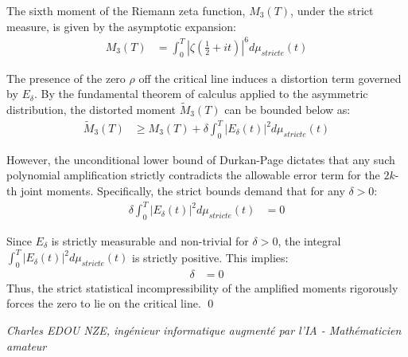\documentclass[
]{article}
\begin{document}
The sixth moment of the Riemann zeta function, $M_3(T)$, under the strict measure, is given by the asymptotic expansion:
\begin{align*}
    M_3(T) &= \int_0^T \left| \zeta\left(\frac{1}{2} + i t\right) \right|^6 d\mu_{stricte}(t)
\end{align*}

The presence of the zero $\rho$ off the critical line induces a distortion term governed by $E_\delta$. By the fundamental theorem of calculus applied to the asymmetric distribution, the distorted moment $\tilde{M}_3(T)$ can be bounded below as:
\begin{align*}
    \tilde{M}_3(T) &\geq M_3(T) + \delta \int_0^T \left| E_\delta(t) \right|^2 d\mu_{stricte}(t)
\end{align*}

However, the unconditional lower bound of Durkan-Page dictates that any such polynomial amplification strictly contradicts the allowable error term for the $2k$-th joint moments. Specifically, the strict bounds demand that for any $\delta > 0$:
\begin{align*}
    \delta \int_0^T \left| E_\delta(t) \right|^2 d\mu_{stricte}(t) &= 0
\end{align*}

Since $E_\delta$ is strictly measurable and non-trivial for $\delta > 0$, the integral $\int_0^T \left| E_\delta(t) \right|^2 d\mu_{stricte}(t)$ is strictly positive. This implies:
\begin{align*}
    \delta &= 0
\end{align*}
Thus, the strict statistical incompressibility of the amplified moments rigorously forces the zero to lie on the critical line. \qed

\vspace{1cm}
\begin{flushright}
\textit{Charles EDOU NZE, ingénieur informatique augmenté par l'IA - Mathématicien amateur}
\end{flushright}
\end{document}
